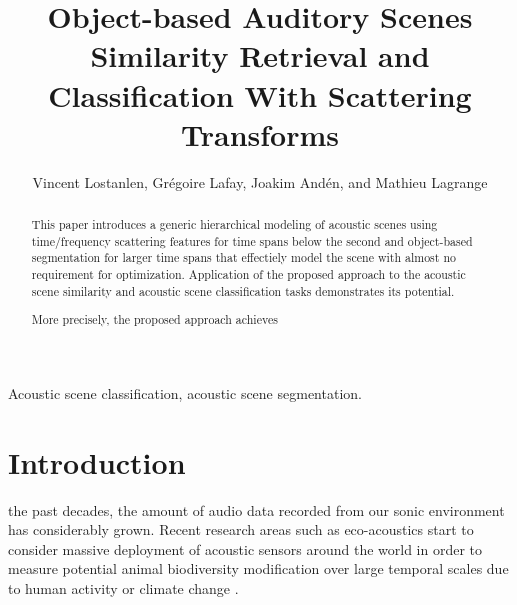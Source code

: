 \documentclass[journal]{IEEEtran}
\begin{document}
%
\title{Object-based Auditory Scenes Similarity Retrieval and Classification With Scattering Transforms}

\author{Vincent Lostanlen, Gr\'egoire Lafay, Joakim And\'en, and Mathieu Lagrange}


\maketitle

\begin{abstract}
This paper introduces a generic hierarchical modeling of acoustic scenes using time/frequency scattering features for time spans below the second and object-based segmentation for larger time spans that effectiely model the scene with almost no requirement for optimization. Application of the proposed approach to the acoustic scene similarity and acoustic scene classification tasks demonstrates its potential.   

More precisely, the proposed approach achieves 
\end{abstract}

\begin{IEEEkeywords}
Acoustic scene classification, acoustic scene segmentation.
\end{IEEEkeywords}

%
\IEEEpeerreviewmaketitle

\section{Introduction}

 the past decades, the amount of audio data recorded from our sonic environment has considerably grown. Recent research areas such as eco-acoustics \cite{ECOACOUSTICS2014, krause} start to consider massive deployment of acoustic sensors around the world in order to measure potential animal biodiversity modification over large temporal scales due to human activity or climate change \cite{NessSST13, stowell13a, stowell13b}. 
\end{document}
